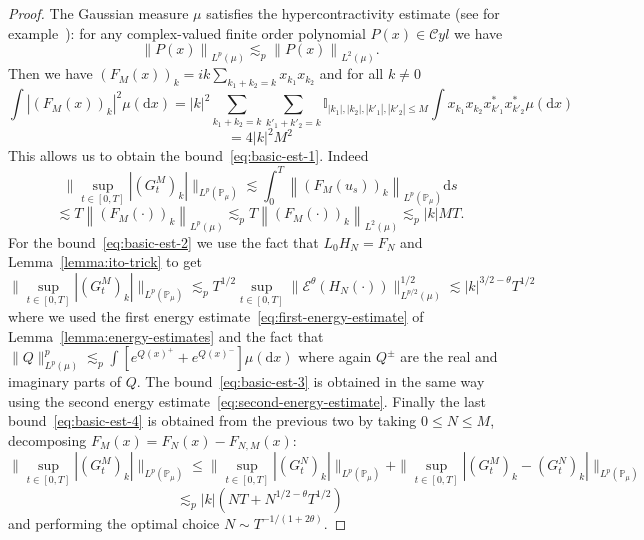 \documentclass[11pt,a4paper,reqno]{amsart}
\newcommand{\PP}{\mathbb{P}}
\newcommand{\II}{\mathbb{I}}
\newcommand{\cE}{\mathcal{E}}
\newcommand{\dd}{\mathrm{d}}
\newcommand{\cyl}{\mathcal{C}yl}
\begin{document}
\begin{proof}
The Gaussian measure $\mu$ satisfies the hypercontractivity estimate (see for example~\cite{janson_gaussian_1997}): for any complex-valued finite order polynomial $P(x)\in\cyl$ we have
\begin{equation}
\label{eq:hypercontractivity}
\left\| P(x) \right\|_{L^p(\mu)}\lesssim_p \left\| P(x) \right\|_{L^2(\mu)}.
\end{equation}
Then we have $(F_M(x))_k = ik \sum_{k_1+k_2=k} x_{k_1} x_{k_2}$ and for all $k\neq 0$
$$
\int |(F_M(x))_k|^2 \mu(\dd x) = |k|^2 \sum_{k_1+k_2=k} \sum_{k'_1+k'_2=k} \II_{|k_1|,|k_2|,|k'_1|,|k'_2|\le M}\int x_{k_1} x_{k_2} x_{k'_1}^* x_{k'_2}^* \mu(\dd x)  
$$
$$
=4 |k|^2 M^2
$$
This allows us to obtain the bound~\eqref{eq:basic-est-1}. Indeed
$$
\|\sup_{t\in[0,T]}\left| (G^M_t)_k \right| \|_{L^p(\PP_\mu)}
\lesssim 
\int_0^T \left\| (F_{M}(u_s))_k \right\|_{L^p(\PP_\mu)}\dd  s 
$$
$$\lesssim 
T \left\| (F_{M}(\cdot))_k  \right\|_{L^p(\mu)}
\lesssim_p T \left\| (F_{M}(\cdot))_k  \right\|_{L^2(\mu)} \lesssim_p
  |k| M T.
$$
For the bound~\eqref{eq:basic-est-2} we use the fact that $L_0 H_N = F_N$ and Lemma~\ref{lemma:ito-trick}  to get 
\begin{equation*}
\|\sup_{t\in[0,T]} \left|(G^M_t)_k\right| \|_{L^p(\PP_\mu)}\lesssim_p T^{1/2} \sup_{t\in[0,T]}
\| \cE^\theta(H_N(\cdot)) \|_{L^{p/2}(\mu)}^{1/2}
\lesssim
|k|^{3/2-\theta} T^{1/2}
\end{equation*}
where we used the first energy estimate~\eqref{eq:first-energy-estimate}
 of Lemma~\ref{lemma:energy-estimates} and the fact that
$
\|Q\|_{L^p(\mu)}^p \lesssim_p \int [e^{Q(x)^+}+e^{Q(x)^-}] \mu(\dd x)
$
where again $Q^\pm$ are the real and imaginary parts of $Q$. 
The bound~\eqref{eq:basic-est-3} is obtained in the same way using the second energy estimate~\eqref{eq:second-energy-estimate}. 
Finally  the last bound~\eqref{eq:basic-est-4} is obtained from the previous two by taking $0\le N\le M$, decomposing $F_M(x) = F_N(x)-F_{N,M}(x)$:
$$
\|\sup_{t\in[0,T]} \left|(G^M_t)_k\right| \|_{L^p(\PP_\mu)} \le \|\sup_{t\in[0,T]} \left|(G^N_t)_k\right| \|_{L^p(\PP_\mu)}+\|\sup_{t\in[0,T]} \left|(G^M_t)_k-(G^N_t)_k\right| \|_{L^p(\PP_\mu)}
$$
$$
\lesssim_p |k|  ( N T+  N^{1/2-\theta} T^{1/2})
$$
and performing the optimal choice $N \sim T^{-1/(1+2\theta)}$.
\end{proof}
\end{document}
